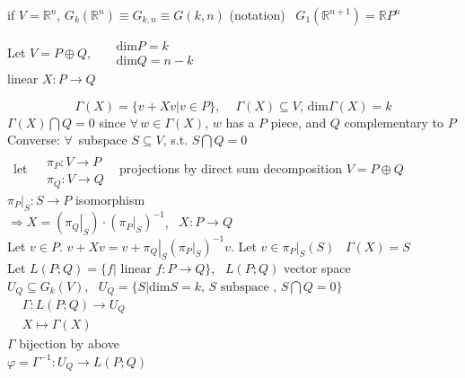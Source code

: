 if $V = \mathbb{R}^n$, $G_k(\mathbb{R}^n) \equiv G_{k,n} \equiv G(k,n)$ (notation) \quad \, $G_1(\mathbb{R}^{n+1}) = \mathbb{R}P^n$

Let $V = P \oplus Q$, \, $\begin{aligned}
  & \text{dim}P =k \\
  & \text{dim}Q = n-k \end{aligned}$ \\

linear $X: P \to Q$ 

\[
\Gamma(X) = \lbrace v + Xv | v \in P \rbrace , \quad \, \Gamma(X) \subseteq V, \, \text{dim}\Gamma(X) = k
\]
$\Gamma(X) \bigcap Q = 0$ since $\forall \, w \in \Gamma(X)$, $w$ has a $P$ piece, and $Q$ complementary to $P$ \\

Converse: $\forall \, $ subspace $S \subseteq V$, s.t. $S\bigcap Q = 0$ \\
\quad \, let $\begin{aligned}
  & \quad \\ 
  & \pi_P : V \to P \\ 
  & \pi_Q: V \to Q
\end{aligned}$ \quad \, projections by direct sum decomposition $V = P\oplus Q$ \\

$\left. \pi_P \right|_S : S \to P$ isomorphism  \\
$\Longrightarrow X = ( \left. \pi_Q \right|_S ) \cdot ( \left. \pi_P \right|_S)^{-1}$, \, $X: P \to Q$ \\

Let $v\in P$.  $v+ Xv = v +  \left. \pi_Q \right|_S (  \left. \pi_P \right|_S)^{-1} v$.  Let $v  \in \left. \pi_P \right|_S (S)$ \quad \, $\Gamma(X) = S$ \\


Let $L(P;Q) = \lbrace f | \text{ linear } f : P \to Q \rbrace$, \, $L(P;Q)$ vector space \\
$U_Q \subseteq G_k(V)$, \, $U_Q = \lbrace S | \text{dim}S =k, \, S \text{ subspace }, \, S \bigcap Q = 0 \rbrace$ \\
$\begin{aligned}
  & \Gamma : L(P;Q) \to U_Q \\
  & X \mapsto \Gamma(X) \end{aligned}$ \\

$\Gamma$ bijection by above \\
$\varphi = \Gamma^{-1} : U_Q \to L(P;Q)$  \\

